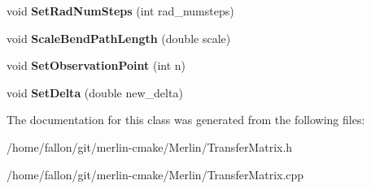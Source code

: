 \begin{DoxyCompactItemize}
\mbox{\label{classTransferMatrix_a9ef2ce3af8809bd493a44ec78e8069f4}} 
void {\bfseries Set\+Rad\+Num\+Steps} (int rad\+\_\+numsteps)
\item 
\mbox{\label{classTransferMatrix_aaacac53ae98c5b577fb36c920a5e3de7}} 
void {\bfseries Scale\+Bend\+Path\+Length} (double scale)
\item 
\mbox{\label{classTransferMatrix_a5bab59bda2847a3f0ecad99466b2e746}} 
void {\bfseries Set\+Observation\+Point} (int n)
\item 
\mbox{\label{classTransferMatrix_a79cd5cc61a482438144a228b09600d4e}} 
void {\bfseries Set\+Delta} (double new\+\_\+delta)
\end{DoxyCompactItemize}


The documentation for this class was generated from the following files\+:\begin{DoxyCompactItemize}
\item 
/home/fallon/git/merlin-\/cmake/\+Merlin/Transfer\+Matrix.\+h\item 
/home/fallon/git/merlin-\/cmake/\+Merlin/Transfer\+Matrix.\+cpp\end{DoxyCompactItemize}

